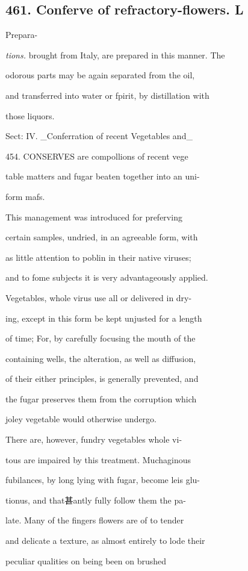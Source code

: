 \documentclass{article}
\begin{document}
\subsection*{461. Conferve of refractory-flowers. L}
Prepara-

\textit{tions.}
brought from Italy, are prepared in this manner. The

odorous parts may be again separated from the oil,

and transferred into water or fpirit, by distillation with

those liquors.

Sect: IV. \_Conferration of recent Vegetables and\_

454. CONSERVES are compollions of recent vege

table matters and fugar beaten together into an uni-

form mafs.

This management was introduced for preferving

certain samples, undried, in an agreeable form, with

as little attention to poblin in their native viruses;

and to fome subjects it is very advantageously applied.

Vegetables, whole virus use all or delivered in dry-

ing, except in this form be kept unjusted for a length

of time; For, by carefully focusing the mouth of the

containing wells, the alteration, as well as diffusion,

of their either principles, is generally prevented, and

the fugar preserves them from the corruption which

joley vegetable would otherwise undergo.

There are, however, fundry vegetables whole vi-

tous are impaired by this treatment. Muchaginous

fubilances, by long lying with fugar, become leis glu-

tionus, and that甚antly fully follow them the pa-

late. Many of the fingers flowers are of to tender

and delicate a texture, as almost entirely to lode their

peculiar qualities on being been on brushed
\end{document}

